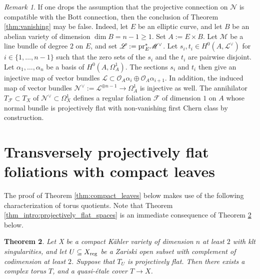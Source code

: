 \documentclass[english,10pt]{amsart}
\renewcommand{\ge}{\geqslant}
\newcommand{\cF}{\mathcal{F}}
\newcommand{\sL}{\mathscr{L}}
\newcommand{\sM}{\mathscr{M}}
\newcommand{\sN}{\mathscr{N}}
\newcommand{\sO}{\mathscr{O}}
\newtheorem{thm}{Theorem}[section]
\theoremstyle{definition}
\theoremstyle{remark}
\newtheorem{rem}[thm]{Remark}
\numberwithin{equation}{section}
\begin{document}
\begin{rem}
If one drops the assumption that the projective connection on $\sN$ is compatible with the Bott connection, then the conclusion of Theorem \ref{thm:vanishing} may be false. Indeed, let $E$ be an elliptic curve, and let $B$ be an abelian variety of dimension $\dim B =n-1 \ge  1$. Set $A:= E \times B$. Let $\sM$ be a line bundle of degree $2$ on $E$, and set $\sL:=\textup{pr}_E^*\sM^\vee$. Let $s_i, t_i \in H^0(A,\sL^\vee)$ for $i \in \{1,\ldots,n-1\}$ such that the zero sets of the $s_i$ and the $t_i$ are pairwise disjoint. Let $\alpha_1,\ldots,\alpha_n$ be a basis of $H^0(A,\Omega_A^1)$.
The sections $s_i$ and $t_i$ then give an injective map of vector bundles $\sL \subset \sO_A \alpha_i \oplus \sO_A \alpha_{i+1}$. In addition, the induced map of vector bundles $\sN^\vee:=\sL^{\oplus n-1} \to \Omega_A^1$ is injective as well. The annihilator $T_\cF \subset T_X$ of $\sN^\vee \subset \Omega_X^1$ defines a regular foliation $\cF$ of dimension $1$ on $A$ whose normal bundle is projectively flat with non-vanishing first Chern class by construction.
\end{rem}

\section{Transversely projectively flat foliations with compact leaves}\label{section:compact_leaves}

The proof of Theorem \ref{thm:compact_leaves} below makes use of the following characterization of torus quotients. Note that Theorem \ref{thm_intro:projectively_flat_spaces} is an immediate consequence of Theorem \ref{thm:projectively_flat_spaces} below.

\begin{thm}\label{thm:projectively_flat_spaces}
Let X be a compact K\"{a}hler variety of dimension $n$ at least $2$ with klt singularities, and let $U \subseteq X_{\textup{reg}}$ be a Zariski open subset with complement of codimension at least $2$. Suppose that $T_U$ is projectively flat. Then there exists a complex torus $T$, and a quasi-\'etale cover $T \to X$.
\end{thm}
\end{document}
